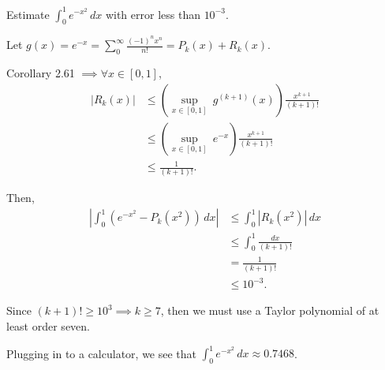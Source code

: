 \documentclass[../hw1]{subfiles}
\begin{document}
\begin{problem}[7]
  Estimate $\int_{0}^{1} e^{-x^2} \,dx$ with error less than $10^{-3}$.
\end{problem}

Let $g(x)=e^{-x}=\sum_{0}^{\infty} \frac{(-1)^n x^n}{n!}=P_k(x) + R_k(x)$.

Corollary 2.61 $\implies \forall x \in [0,1]$,
\begin{align*}
	| R_k(x) | & \le \left( \underset{x \in [0,1]}{\sup}\ g^{(k+1)}(x) \right)  \frac{x^{k+1}}{(k+1)!} \\
	           & \le \left( \underset{x \in [0,1]}{\sup}\ e^{-x} \right)  \frac{x^{k+1}}{(k+1)!}       \\
	           & \le \frac{1}{(k + 1)!}
	.\end{align*}

Then,
\begin{align*}
  \left| \int_{0}^{1} \left( e^{-x^2}-P_k(x^2) \right)\,dx \right| &\le \int_{0}^{1} |R_k(x^2)| \,dx \\ 
                                                                   &\le \int_{0}^{1} \frac{dx}{(k+1)!} \\ 
                                                                   &= \frac{1}{(k+1)!} \\
                                                                   &\le 10^{-3}
.\end{align*}

Since $(k+1)!\ge 10^3 \implies k \ge 7$, then we must use a Taylor polynomial of at least order seven. 

Plugging in to a calculator, we see that $\int_{0}^{1} e^{-x^2} \,dx \approx 0.7468$.
\end{document}
